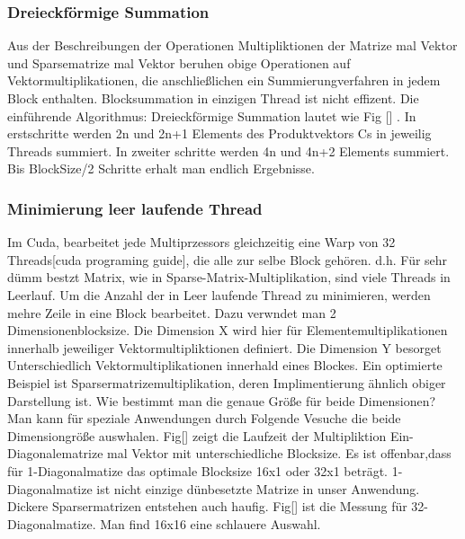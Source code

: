 \subsubsection{Dreieckförmige Summation}
Aus der Beschreibungen der Operationen Multipliktionen der Matrize mal Vektor und Sparsematrize  mal Vektor beruhen obige Operationen auf Vektormultiplikationen, die anschließlichen ein Summierungverfahren in jedem Block enthalten. Blocksummation in einzigen Thread ist nicht effizent. Die einführende Algorithmus: Dreieckförmige Summation lautet wie Fig [] . In erstschritte werden 2n und 2n+1 Elements des Produktvektors Cs in jeweilig Threads summiert. In zweiter schritte werden 4n und 4n+2 Elements summiert. Bis BlockSize/2 Schritte erhalt man endlich Ergebnisse.


\subsubsection{Minimierung leer laufende Thread}
Im Cuda, bearbeitet jede Multiprzessors gleichzeitig eine Warp von 32 Threads[cuda programing guide], die alle zur selbe Block gehören. d.h. Für sehr dümm bestzt Matrix, wie in Sparse-Matrix-Multiplikation, sind viele Threads in Leerlauf. Um die Anzahl der in Leer laufende Thread zu minimieren, werden mehre Zeile in eine Block bearbeitet. Dazu verwndet man 2 Dimensionenblocksize. Die Dimension X wird hier für Elementemultiplikationen innerhalb jeweiliger Vektormultipliktionen definiert. Die Dimension Y besorget Unterschiedlich Vektormultiplikationen innerhald eines Blockes. Ein optimierte Beispiel ist Sparsermatrizemultiplikation, deren Implimentierung ähnlich obiger Darstellung ist. Wie bestimmt man die genaue Größe für beide Dimensionen?  Man kann für speziale Anwendungen durch Folgende Vesuche die beide Dimensiongröße auswhalen. Fig[] zeigt die Laufzeit der Multipliktion Ein-Diagonalematrize mal Vektor mit unterschiedliche Blocksize. Es ist offenbar,dass für 1-Diagonalmatize das optimale Blocksize 16x1 oder 32x1 beträgt. 1-Diagonalmatize ist nicht einzige dünbesetzte Matrize in unser Anwendung. Dickere Sparsermatrizen entstehen auch haufig. Fig[] ist die Messung für 32-Diagonalmatize. Man find 16x16 eine schlauere Auswahl.

